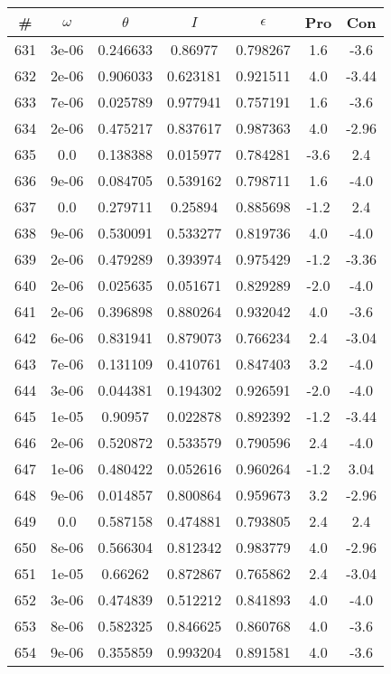\begin{table}
\begin{tabular}{c|c|c|c|c|c|c}
\# & $\omega$ & $\theta$ & $I$ & $\epsilon$ & Pro & Con\\
\hline
631 & 3e-06 & 0.246633 & 0.86977 & 0.798267 & 1.6 & -3.6\\
632 & 2e-06 & 0.906033 & 0.623181 & 0.921511 & 4.0 & -3.44\\
633 & 7e-06 & 0.025789 & 0.977941 & 0.757191 & 1.6 & -3.6\\
634 & 2e-06 & 0.475217 & 0.837617 & 0.987363 & 4.0 & -2.96\\
635 & 0.0 & 0.138388 & 0.015977 & 0.784281 & -3.6 & 2.4\\
636 & 9e-06 & 0.084705 & 0.539162 & 0.798711 & 1.6 & -4.0\\
637 & 0.0 & 0.279711 & 0.25894 & 0.885698 & -1.2 & 2.4\\
638 & 9e-06 & 0.530091 & 0.533277 & 0.819736 & 4.0 & -4.0\\
639 & 2e-06 & 0.479289 & 0.393974 & 0.975429 & -1.2 & -3.36\\
640 & 2e-06 & 0.025635 & 0.051671 & 0.829289 & -2.0 & -4.0\\
641 & 2e-06 & 0.396898 & 0.880264 & 0.932042 & 4.0 & -3.6\\
642 & 6e-06 & 0.831941 & 0.879073 & 0.766234 & 2.4 & -3.04\\
643 & 7e-06 & 0.131109 & 0.410761 & 0.847403 & 3.2 & -4.0\\
644 & 3e-06 & 0.044381 & 0.194302 & 0.926591 & -2.0 & -4.0\\
645 & 1e-05 & 0.90957 & 0.022878 & 0.892392 & -1.2 & -3.44\\
646 & 2e-06 & 0.520872 & 0.533579 & 0.790596 & 2.4 & -4.0\\
647 & 1e-06 & 0.480422 & 0.052616 & 0.960264 & -1.2 & 3.04\\
648 & 9e-06 & 0.014857 & 0.800864 & 0.959673 & 3.2 & -2.96\\
649 & 0.0 & 0.587158 & 0.474881 & 0.793805 & 2.4 & 2.4\\
650 & 8e-06 & 0.566304 & 0.812342 & 0.983779 & 4.0 & -2.96\\
651 & 1e-05 & 0.66262 & 0.872867 & 0.765862 & 2.4 & -3.04\\
652 & 3e-06 & 0.474839 & 0.512212 & 0.841893 & 4.0 & -4.0\\
653 & 8e-06 & 0.582325 & 0.846625 & 0.860768 & 4.0 & -3.6\\
654 & 9e-06 & 0.355859 & 0.993204 & 0.891581 & 4.0 & -3.6\\

\end{tabular}
\end{table}
